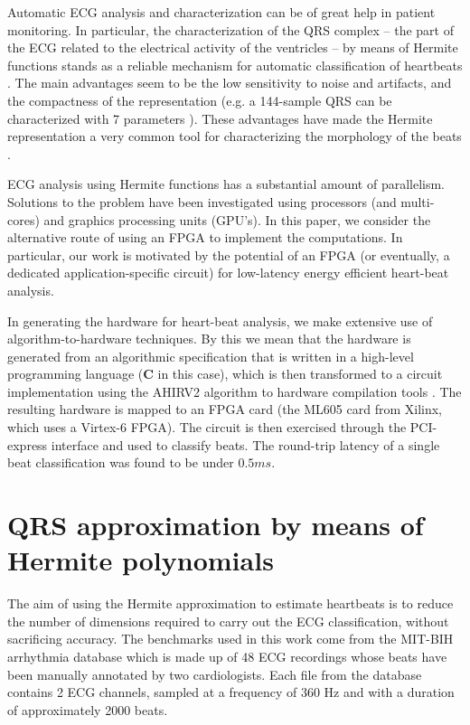 \documentclass[conference]{IEEEtran}
\begin{document}
Automatic ECG analysis and characterization can be of great help
in patient monitoring. In particular, the characterization of the QRS complex -- the part of the ECG related to the electrical activity of the ventricles -- by means of Hermite functions 
stands as a reliable mechanism  for automatic classification of heartbeats \cite{j:lagerholm00}. 
The main advantages seem to be the low sensitivity to noise and artifacts, and the
compactness of the representation (e.g. a 144-sample QRS can be characterized with 7 parameters \cite{c:marquez13}). 
These advantages have made the Hermite representation a very common tool for characterizing the 
morphology of the beats \cite{j:lagerholm00,c:marquez13,c:braccini97,j:linh03a,j:linh03b}. 

ECG analysis using Hermite functions has a
substantial amount of parallelism.  Solutions to the problem have been investigated
using processors (and multi-cores) and graphics processing units (GPU's). 
In this paper, we consider the alternative route of using an FPGA to implement
the computations.  In particular, our work is motivated by the potential
of an FPGA (or eventually, a dedicated application-specific circuit) for low-latency
energy efficient heart-beat analysis.  

In generating the hardware for heart-beat analysis, we make extensive use of
algorithm-to-hardware techniques.  By this we mean that the hardware is
generated from an algorithmic specification that is written in a
high-level programming language ({\bf C} in this case), which is then
transformed to a circuit implementation using the AHIRV2 algorithm to hardware 
compilation tools \cite{c:ahir_thesis2009,c:ahir_dsd2010,c:ahir_usenix2012}.
The resulting hardware is %
 mapped to an FPGA card (the ML605 card from Xilinx,
which uses a Virtex-6 FPGA).  The circuit is then exercised through the PCI-express 
interface and used to classify beats.  The round-trip latency of a single
beat classification was found to be under $0.5ms$.


\section{QRS approximation by means of Hermite polynomials}\label{s:arr}

The aim of using the Hermite approximation to estimate heartbeats is to 
reduce the number of dimensions required to carry out the ECG classification, 
without sacrificing accuracy. 
The benchmarks used in this work come from the MIT-BIH arrhythmia database \cite{j:moody01} which is made up of 
48 ECG recordings whose beats  have been manually annotated by two cardiologists. 
Each file from the database 
contains 2 ECG channels, sampled at a frequency of 360 Hz and with a duration of approximately 2000 beats. 
\end{document}
